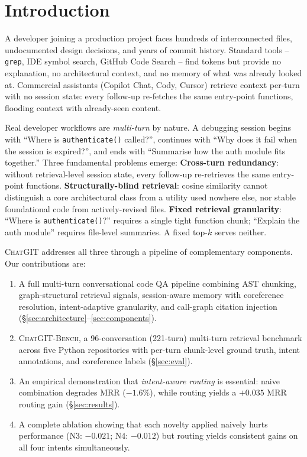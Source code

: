 \documentclass[runningheads]{llncs}
\newcommand{\chatgit}{\textsc{ChatGIT}\xspace}
\newcommand{\conv}{\textsc{ChatGIT-Bench}\xspace}
\begin{document}
\section{Introduction}
\label{sec:intro}

A developer joining a production project faces hundreds of interconnected
files, undocumented design decisions, and years of commit history. Standard
tools -- \texttt{grep}, IDE symbol search, GitHub Code Search -- find tokens
but provide no explanation, no architectural context, and no memory of what
was already looked at. Commercial assistants (Copilot Chat, Cody, Cursor)
retrieve context per-turn with no session state: every follow-up re-fetches
the same entry-point functions, flooding context with already-seen content.

Real developer workflows are \emph{multi-turn} by nature. A debugging session
begins with ``Where is \texttt{authenticate()} called?'', continues with
``Why does it fail when the session is expired?'', and ends with ``Summarise
how the auth module fits together.'' Three fundamental problems emerge:
\textbf{Cross-turn redundancy}: without retrieval-level session state,
every follow-up re-retrieves the same entry-point functions.
\textbf{Structurally-blind retrieval}: cosine similarity cannot distinguish
a core architectural class from a utility used nowhere else, nor stable
foundational code from actively-revised files.
\textbf{Fixed retrieval granularity}: ``Where is \texttt{authenticate()}?''
requires a single tight function chunk; ``Explain the auth module'' requires
file-level summaries. A fixed top-$k$ serves neither.

\chatgit addresses all three through a pipeline of complementary components.
Our contributions are:
\begin{enumerate}[label=(\arabic*),leftmargin=*]
  \item A full multi-turn conversational code QA pipeline combining AST
        chunking, graph-structural retrieval signals, session-aware memory
        with coreference resolution, intent-adaptive granularity, and
        call-graph citation injection (\S\ref{sec:architecture}--\ref{sec:components}).
  \item \conv, a 96-conversation (221-turn) multi-turn retrieval benchmark
        across five Python repositories with per-turn chunk-level ground truth,
        intent annotations, and coreference labels (\S\ref{sec:eval}).
  \item An empirical demonstration that \emph{intent-aware routing} is
        essential: naive combination degrades MRR ($-1.6\%$), while routing
        yields a $+0.035$ MRR routing gain (\S\ref{sec:results}).
  \item A complete ablation showing that each novelty applied naively hurts
        performance (N3: $-0.021$; N4: $-0.012$) but routing yields consistent
        gains on all four intents simultaneously.
\end{enumerate}
\end{document}
